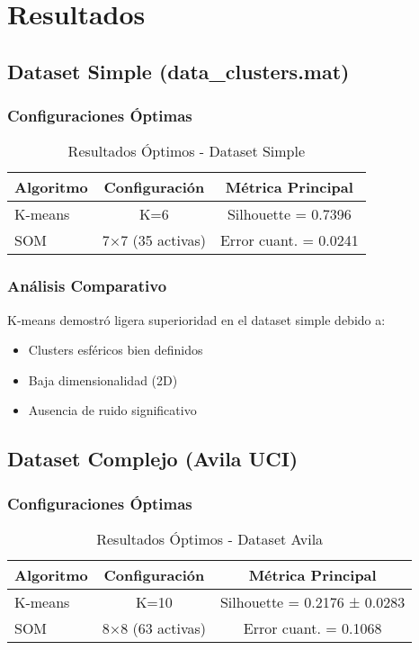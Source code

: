\documentclass[12pt,a4paper]{article}
\begin{document}
\section{Resultados}

\subsection{Dataset Simple (data\_clusters.mat)}

\subsubsection{Configuraciones Óptimas}
\begin{table}[H]
\centering
\caption{Resultados Óptimos - Dataset Simple}
\begin{tabular}{lcc}
\toprule
\textbf{Algoritmo} & \textbf{Configuración} & \textbf{Métrica Principal} \\
\midrule
K-means & K=6 & Silhouette = 0.7396 \\
SOM & 7×7 (35 activas) & Error cuant. = 0.0241 \\
\bottomrule
\end{tabular}
\end{table}

\subsubsection{Análisis Comparativo}
K-means demostró ligera superioridad en el dataset simple debido a:
\begin{itemize}
    \item Clusters esféricos bien definidos
    \item Baja dimensionalidad (2D)
    \item Ausencia de ruido significativo
\end{itemize}

\subsection{Dataset Complejo (Avila UCI)}

\subsubsection{Configuraciones Óptimas}
\begin{table}[H]
\centering
\caption{Resultados Óptimos - Dataset Avila}
\begin{tabular}{lcc}
\toprule
\textbf{Algoritmo} & \textbf{Configuración} & \textbf{Métrica Principal} \\
\midrule
K-means & K=10 & Silhouette = 0.2176 ± 0.0283 \\
SOM & 8×8 (63 activas) & Error cuant. = 0.1068 \\
\bottomrule
\end{tabular}
\end{table}
\end{document}
